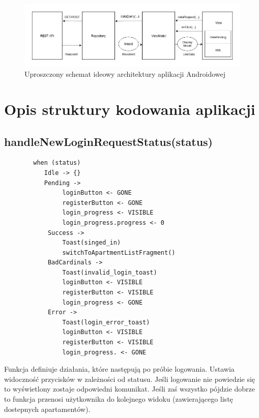 \documentclass[polish, 11pt]{article}
\begin{document}
    \begin{figure}[H]
    	\centering
    	\includegraphics[width=\textwidth]{figures/androidArch.png}
    	\caption{Uproszczony schemat ideowy architektury aplikacji Androidowej}
    \end{figure}   
        
\section{Opis struktury kodowania aplikacji}
    \subsection{handleNewLoginRequestStatus(status)}
        \begin{lstlisting}
        when (status) 
           Idle -> {}
           Pending -> 
                loginButton <- GONE
                registerButton <- GONE
                login_progress <- VISIBLE
                login_progress.progress <- 0
            Success -> 
                Toast(singed_in)
                switchToApartmentListFragment()
            BadCardinals -> 
                Toast(invalid_login_toast)
                loginButton <- VISIBLE
                registerButton <- VISIBLE
                login_progress <- GONE
            Error -> 
                Toast(login_error_toast)
                loginButton <- VISIBLE
                registerButton <- VISIBLE
                login_progress. <- GONE
         \end{lstlisting}
         Funkcja definiuje działania, które następują po próbie logowania. Ustawia widoczność przycisków w zależności od statusu. Jeśli logowanie nie powiedzie się to wyświetlony zostaje odpowiedni komunikat. Jeśli zaś wszystko pójdzie dobrze to funkcja przenosi użytkownika do kolejnego widoku (zawierającego listę dostepnych apartamentów).
         
\end{document}
